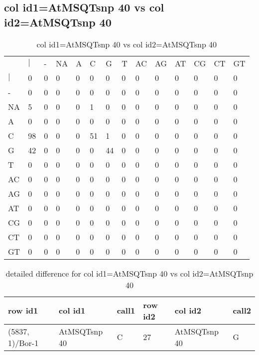 \subsection{col id1=AtMSQTsnp 40 vs col id2=AtMSQTsnp 40}
\begin{center}
\begin{longtable}{|l|l|l|l|l|l|l|l|l|l|l|l|l|l|}
\caption{col id1=AtMSQTsnp 40 vs col id2=AtMSQTsnp 40} \label{table_dm716}\\
\hline
\\
\hline
&$|$&-&NA&A&C&G&T&AC&AG&AT&CG&CT&GT\\
$|$&0&0&0&0&0&0&0&0&0&0&0&0&0\\
-&0&0&0&0&0&0&0&0&0&0&0&0&0\\
NA&5&0&0&0&1&0&0&0&0&0&0&0&0\\
A&0&0&0&0&0&0&0&0&0&0&0&0&0\\
C&98&0&0&0&51&1&0&0&0&0&0&0&0\\
G&42&0&0&0&0&44&0&0&0&0&0&0&0\\
T&0&0&0&0&0&0&0&0&0&0&0&0&0\\
AC&0&0&0&0&0&0&0&0&0&0&0&0&0\\
AG&0&0&0&0&0&0&0&0&0&0&0&0&0\\
AT&0&0&0&0&0&0&0&0&0&0&0&0&0\\
CG&0&0&0&0&0&0&0&0&0&0&0&0&0\\
CT&0&0&0&0&0&0&0&0&0&0&0&0&0\\
GT&0&0&0&0&0&0&0&0&0&0&0&0&0\\
\hline
\end{longtable}
\end{center}

\begin{center}
\begin{longtable}{|l|l|l|l|l|l|}
\caption{detailed difference for col id1=AtMSQTsnp 40 vs col id2=AtMSQTsnp 40} \label{table_dm717}\\
\hline
row id1&col id1&call1&row id2&col id2&call2\\
\hline
(5837, 1)/Bor-1&AtMSQTsnp 40&C&27&AtMSQTsnp 40&G\\
\hline
\end{longtable}
\end{center}

